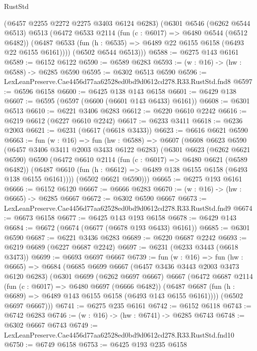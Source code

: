 \begin{lexlean}{RustStd}
\begin{coremodule}
      (@6457 @2255 @2272 @2275 @3403 @6124 @6283)
      (@6301
        @6546
        (@6262 @6544 @6513)
        @6513
        (@6472
          @6533
          @2114
          (fun (c : @6017) => @6480 @6544 (@6512 @6482))
          (@6487 @6533 (fun (h : @6535) => @6489 @22 @6155 @6158 (@6493 @22 @6155 @6161))))
        (@6502 @6544 @6513)))
@6588 := @6275 @143 @6161
@6589 := @6152 @6122
@6590 := @6589 @6283
@6593 := (w : @16) -> (hw : @6588) -> @6285 @6590
@6595 := @6302 @6513 @6590
@6596 := LexLeanPreserve.Cae4456d77aa62528ed0bd9d0612cd278.R33.RustStd.fnd8
@6597 := @6596 @6158
@6600 := @6425 @138 @143 @6158
@6601 := @6429 @138
@6607 := @6595 (@6597 (@6600 (@6601 @143 @6433) @6161))
@6608 := @6301 @6513
@6610 := @6221 @3406 @6283
@6612 := @6220 @6610 @2242
@6616 := @6219 @6612 (@6227 @6610 @2242)
@6617 := @6233 @3411
@6618 := @6236 @2003
@6621 := @6231 (@6617 (@6618 @3433))
@6623 := @6616 @6621 @6590
@6663 := fun (w : @16) =>
  fun (hw : @6588) =>
  @6607
    (@6608
      @6623
      @6590
      (@6457 @3406 @3411 @2003 @3433 @6122 @6283)
      (@6301
        @6623
        (@6262 @6621 @6590)
        @6590
        (@6472
          @6610
          @2114
          (fun (c : @6017) => @6480 @6621 (@6589 @6482))
          (@6487 @6610 (fun (h : @6612) => @6489 @138 @6155 @6158 (@6493 @138 @6155 @6161))))
        (@6502 @6621 @6590)))
@6665 := @6275 @193 @6161
@6666 := @6152 @6120
@6667 := @6666 @6283
@6670 := (w : @16) -> (hw : @6665) -> @6285 @6667
@6672 := @6302 @6590 @6667
@6673 := LexLeanPreserve.Cae4456d77aa62528ed0bd9d0612cd278.R33.RustStd.fnd9
@6674 := @6673 @6158
@6677 := @6425 @143 @193 @6158
@6678 := @6429 @143
@6684 := @6672 (@6674 (@6677 (@6678 @193 @6433) @6161))
@6685 := @6301 @6590
@6687 := @6221 @3436 @6283
@6689 := @6220 @6687 @2242
@6693 := @6219 @6689 (@6227 @6687 @2242)
@6697 := @6231 (@6233 @3443 (@6618 @3473))
@6699 := @6693 @6697 @6667
@6739 := fun (w : @16) =>
  fun (hw : @6665) =>
  @6684
    (@6685
      @6699
      @6667
      (@6457 @3436 @3443 @2003 @3473 @6120 @6283)
      (@6301
        @6699
        (@6262 @6697 @6667)
        @6667
        (@6472
          @6687
          @2114
          (fun (c : @6017) => @6480 @6697 (@6666 @6482))
          (@6487 @6687 (fun (h : @6689) => @6489 @143 @6155 @6158 (@6493 @143 @6155 @6161))))
        (@6502 @6697 @6667)))
@6741 := @6275 @235 @6161
@6742 := @6152 @6118
@6743 := @6742 @6283
@6746 := (w : @16) -> (hw : @6741) -> @6285 @6743
@6748 := @6302 @6667 @6743
@6749 := LexLeanPreserve.Cae4456d77aa62528ed0bd9d0612cd278.R33.RustStd.fnd10
@6750 := @6749 @6158
@6753 := @6425 @193 @235 @6158

\end{coremodule}
\end{lexlean}
